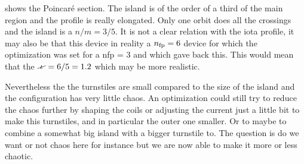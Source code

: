  shows the Poincaré section. The island is of the order of a third of the main region and the profile is really elongated. Only one orbit does all the crossings and the island is a $n/m = 3/5$. It is not a clear relation with the iota profile, it may also be that this device in reality a $n_\text{fp} = 6$ device for which the optimization was set for a nfp = 3 and which gave back this. This would mean that the $\iotaslash = 6/5 = 1.2$ which may be more realistic.

Nevertheless the the turnstiles are small compared to the size of the island and the configuration has very little chaos. An optimization could still try to reduce the chaos further by shaping the coils or adjusting the current just a little bit to make this turnstiles, and in particular the outer one smaller. Or to maybe to combine a somewhat big island with a bigger turnstile to. The question is do we want or not chaos here for instance but we are now able to make it more or less chaotic.

